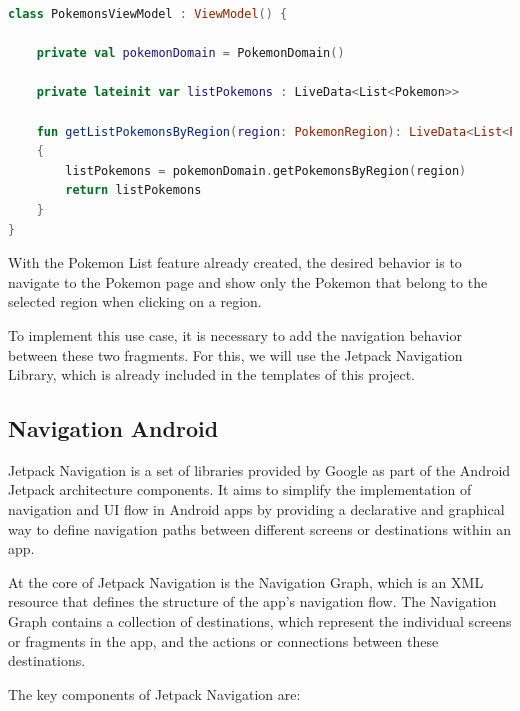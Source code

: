 \documentclass[a4paper, 12pt]{article}
\begin{document}
\begin{lstlisting}[caption={Pokemons ViewModel code.}, label={code:code_pokemons_vm}, language=Kotlin]
    class PokemonsViewModel : ViewModel() {

    private val pokemonDomain = PokemonDomain()

    private lateinit var listPokemons : LiveData<List<Pokemon>>

    fun getListPokemonsByRegion(region: PokemonRegion): LiveData<List<Pokemon>>
    {
        listPokemons = pokemonDomain.getPokemonsByRegion(region)
        return listPokemons
    }
}
\end{lstlisting}


With the Pokemon List feature already created, the desired behavior is to navigate to the Pokemon page and show only the Pokemon that belong to the selected region when clicking on a region.

To implement this use case, it is necessary to add the navigation behavior between these two fragments. 
For this, we will use the Jetpack Navigation Library, which is already included in the templates of this project.

\subsection{Navigation Android}

Jetpack Navigation is a set of libraries provided by Google as part of the Android Jetpack architecture components.
It aims to simplify the implementation of navigation and UI flow in Android apps by providing a declarative and graphical way to define navigation paths between different screens or destinations within an app.

At the core of Jetpack Navigation is the Navigation Graph, which is an XML resource that defines the structure of the app's navigation flow. 
The Navigation Graph contains a collection of destinations, which represent the individual screens or fragments in the app, and the actions or connections between these destinations.

The key components of Jetpack Navigation are:
\end{document}
